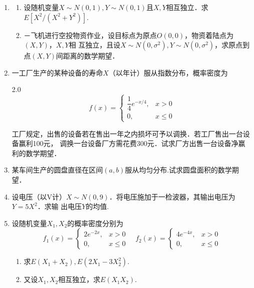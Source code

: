 \begin{enumerate}
    \item \begin{enumerate}
        \item 设随机变量$X\sim N(0,1),Y\sim N(0,1)$且$X,Y$相互独立．求$E[X^2/(X^2+Y^2)]$.
        \item －飞机进行空投物资作业，设目标点为原点$O(0,0)$，物资着陆点为$(X,Y)$，$X,Y$相
        互独立，且设$X\sim N(0,\sigma^2),Y\sim N(0,\sigma^2)$，求原点到点$(X,Y)$间距离的数学期望．
    \end{enumerate}


    \item 一工厂生产的某种设备的寿命$X$（以年计）服从指数分布，概率密度为
    \vspace{-0.5cm}
    \begin{spacing}{2.0}
    $$f(x)=\left\{\begin{array}{ll} 
        \dfrac{1}{4}e^{-x/4}, & x>0\\
        0, & x\leq 0
    \end{array}\right.$$
    \end{spacing}
    \vspace{-0.5cm}
    工厂规定，出售的设备若在售出一年之内损坏可予以调换．若工厂售出一台设备赢利100元，
    调换一台设备厂方需花费300元．试求厂方出售一台设备净赢利的数学期望．
    

    \item 某车间生产的圆盘直径在区间$(a,b)$服从均匀分布.试求圆盘面积的数学期望．
    


    \item 设电压（以V计）$X\sim N(0,9)$．将电压施加于一检波器，其输出电压为$Y=5X^2$．求输
    出电压$Y$的均值.


    \item 设随机变量$X_1,X_2$的概率密度分别为
    $$f_1(x)=\left\{\begin{array}{ll}
        2e^{-2x}, & x>0\\
        0, & x\leq 0
    \end{array}\right.\quad
    f_2(x)=\left\{\begin{array}{ll}
        4e^{-4x}, & x>0\\
        0, & x\leq 0
    \end{array}\right.$$
    \begin{enumerate}
        \item 求$E(X_1+X_2),E(2X_1-3X_2^2)$.
        \item 又设$X_1,X_2$相互独立，求$E(X_1X_2)$.
    \end{enumerate}



\end{enumerate}
